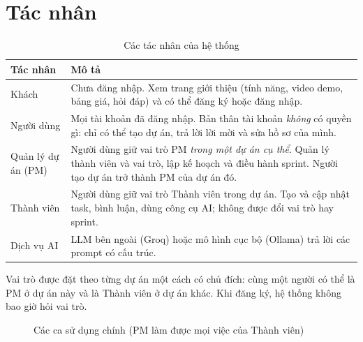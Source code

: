 \documentclass[../main.tex]{subfiles}
\begin{document}
\section{Tác nhân}
\begin{table}[H]
\centering
\caption{Các tác nhân của hệ thống}\label{tab:actors}
\renewcommand{\arraystretch}{1.25}
\begin{tabular}{|p{3.2cm}|p{10.5cm}|}
\hline
\textbf{Tác nhân} & \textbf{Mô tả} \\ \hline
Khách & Chưa đăng nhập. Xem trang giới thiệu (tính năng, video demo, bảng giá, hỏi đáp) và có thể đăng ký hoặc đăng nhập. \\ \hline
Người dùng & Mọi tài khoản đã đăng nhập. Bản thân tài khoản \emph{không} có quyền gì: chỉ có thể tạo dự án, trả lời lời mời và sửa hồ sơ của mình. \\ \hline
Quản lý dự án (PM) & Người dùng giữ vai trò PM \emph{trong một dự án cụ thể}. Quản lý thành viên và vai trò, lập kế hoạch và điều hành sprint. Người tạo dự án trở thành PM của dự án đó. \\ \hline
Thành viên & Người dùng giữ vai trò Thành viên trong dự án. Tạo và cập nhật task, bình luận, dùng công cụ AI; không được đổi vai trò hay sprint. \\ \hline
Dịch vụ AI & LLM bên ngoài (Groq) hoặc mô hình cục bộ (Ollama) trả lời các prompt có cấu trúc. \\ \hline
\end{tabular}
\end{table}

Vai trò được đặt theo từng dự án một cách có chủ đích: cùng một người có thể là PM ở dự án này và là
Thành viên ở dự án khác. Khi đăng ký, hệ thống không bao giờ hỏi vai trò.

\begin{figure}[H]
\centering
{}
\caption{Các ca sử dụng chính (PM làm được mọi việc của Thành viên)}\label{fig:usecase}
\end{figure}
\end{document}
